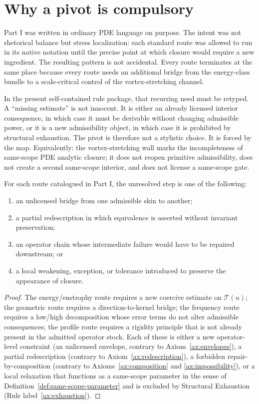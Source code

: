 \section{Why a pivot is compulsory}
Part I was written in ordinary PDE language on purpose. The intent was not rhetorical balance but
stress localization: each standard route was allowed to run in its native notation until the precise
point at which closure would require a new ingredient. The resulting pattern is not accidental.
Every route terminates at the same place because every route needs an additional bridge from the
energy-class bundle to a scale-critical control of the vortex-stretching channel.

In the present self-contained rule package, that recurring need must be retyped. A ``missing estimate'' is not
innocent. It is either an already licensed interior consequence, in which case it must be derivable
without changing admissible power, or it is a new admissibility object, in which case it is prohibited
by structural exhaustion. The pivot is therefore not a stylistic choice. It is forced by the map.
Equivalently: the vortex-stretching wall marks the incompleteness of same-scope PDE analytic closure; it does not reopen primitive admissibility, does not create a second same-scope interior, and does not license a same-scope gate.

\begin{proposition}\label{prop:retyped-wall}
For each route catalogued in Part I, the unresolved step is one of the following:
\begin{enumerate}[label=(\roman*), leftmargin=2.2em]
\item an unlicensed bridge from one admissible skin to another;
\item a partial redescription in which equivalence is asserted without invariant preservation;
\item an operator chain whose intermediate failure would have to be repaired downstream; or
\item a local weakening, exception, or tolerance introduced to preserve the appearance of closure.
\end{enumerate}
\end{proposition}

\begin{proof}
The energy/enstrophy route requires a new coercive estimate on $\mathcal T(u)$; the geometric route
requires a direction-to-kernel bridge; the frequency route requires a low/high decomposition whose
error terms do not alter admissible consequences; the profile route requires a rigidity principle that
is not already present in the admitted operator stock. Each of these is either a new operator-level
constraint (an unlicensed envelope, contrary to Axiom~\ref{ax:envelopes}), a partial redescription (contrary to Axiom~\ref{ax:redescription}), a forbidden repair-by-composition (contrary to Axioms~\ref{ax:composition} and \ref{ax:impossibility}), or a local relaxation that functions as a same-scope parameter in the sense of Definition~\ref{def:same-scope-parameter} and is excluded by Structural Exhaustion (Rule label~\ref{ax:exhaustion}).
\end{proof}


